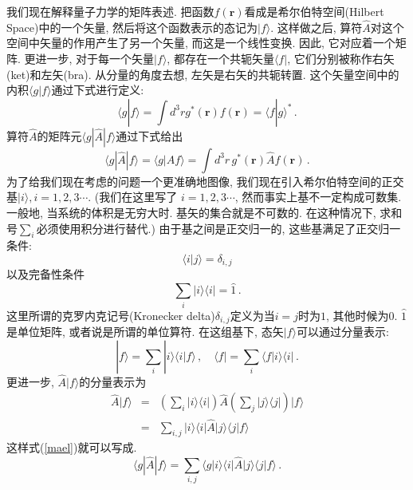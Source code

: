 \documentclass[b5paper]{book}
\begin{document}
我们现在解释量子力学的矩阵表述. 把函数$f(\mathbf{r})$看成是希尔伯特空间(Hilbert Space)中的一个矢量, 然后将这个函数表示的态记为$|f\rangle$. 这样做之后, 算符$\hat{A}$对这个空间中矢量的作用产生了另一个矢量, 而这是一个线性变换. 因此, 它对应着一个矩阵. 更进一步, 对于每一个矢量$|f\rangle$, 都存在一个共轭矢量$\langle f|$, 它们分别被称作右矢(ket)和左矢(bra). 从分量的角度去想, 左矢是右矢的共轭转置. 这个矢量空间中的内积$\langle g|f\rangle$通过下式进行定义:
\begin{equation}\label{inpro}
\langle g|f\rangle =\int d^3r g^*(\mathbf{r})f(\mathbf{r})=\langle f|g\rangle^*\,.
\end{equation}
算符$\hat{A}$的矩阵元$\langle g|\hat{A}|f\rangle$通过下式给出
\begin{equation}\label{mael}
\langle g|\hat{A}|f\rangle=\langle g|\hat{A}f\rangle=\int d^3r\,g^*(\mathbf{r})\hat{A}f(\mathbf{r})\,.
\end{equation}
为了给我们现在考虑的问题一个更准确地图像, 我们现在引入希尔伯特空间的正交基$|i\rangle, i=1,2,3\cdots$. (我们在这里写了 $i=1,2,3\cdots$, 然而事实上基不一定构成可数集. 一般地, 当系统的体积是无穷大时. 基矢的集合就是不可数的. 在这种情况下, 求和号$\sum_i$必须使用积分进行替代.) 由于基之间是正交归一的, 这些基满足了正交归一条件:
\begin{equation}
\langle i|j\rangle=\delta_{i,j}
\end{equation}
以及完备性条件
\begin{equation}
\sum_{i}|i\rangle\langle i|=\hat{1}\,.
\end{equation}
这里所谓的克罗内克记号(Kronecker delta)$\delta_{i,j}$定义为当$i=j$时为$1$, 其他时候为$0$. $\hat{1}$是单位矩阵, 或者说是所谓的单位算符. 在这组基下, 态矢$|f\rangle$可以通过分量表示:
\begin{equation}
|f\rangle=\sum_i |i\rangle\langle i|f\rangle\,,\quad \langle f|=\sum_i\langle f|i\rangle \langle i|\,.
\end{equation}
更进一步, $\hat{A}|f\rangle$的分量表示为
\begin{eqnarray}
\hat{A}|f\rangle&=&\left(\sum_i |i\rangle \langle i|\right)\hat{A}\left(\sum_j |j\rangle\langle j|\right)|f\rangle\nonumber\\
&=&\sum_{i,j}|i\rangle \langle i|\hat{A}|j\rangle \langle j|f\rangle
\end{eqnarray}
这样式(\ref{mael})就可以写成.
\begin{equation}
\langle g|\hat{A}|f\rangle=\sum_{i,j}\langle g|i\rangle \langle i|\hat{A}|j\rangle\langle j|f\rangle\,.
\end{equation}
\end{document}
